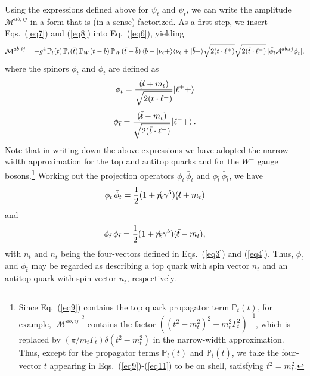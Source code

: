 \documentclass[aps,preprint,tightenlines,floatfix,superscriptaddress,nofootinbib,showpacs]{revtex4-1}
\def\beq{\begin{equation}}
\def\eeq{\end{equation}}
\def\tbslash{\tbar\hspace{-10pt}\not{}\hspace{4pt}}
\def\tslash{t\hspace{-10pt}\not{}\hspace{4pt}}
\def\nslash{n\hspace{-10pt}\not{}\hspace{4pt}}
\def\tbar{\bar{t}}
\def\bbar{\bar{b}}
\def\nubar{{\bar{\nu}}_{\ell}}
\providecommand{\DIFadd}[1]{{\protect\color{blue}\uwave{#1}}} %
\providecommand{\DIFaddbegin}{} %
\providecommand{\DIFaddend}{} %
\begin{document}
Using the expressions defined above for $\bar{\psi}_t$ and
$\psi_{\tbar}$, we can write the amplitude $\mathcal{M}^{ab,ij}$
in a form that is (in a sense) factorized.
As a first step, we insert
Eqs.~(\ref{eq7}) and (\ref{eq8}) into Eq.~(\ref{eq6}), yielding
%
\beq
\label{eq9}
\mathcal{M}^{ab,ij}=\!-g^4\,\mathbb{P}_t(t)\,\mathbb{P}_t(\tbar)\,\mathbb{P}_W(t-b)\,\mathbb{P}_W(\tbar-\bbar)\,\langle b-|\nu_{\ell}+\rangle \langle\nubar+|\bbar-\rangle \sqrt{\strut2(t\cdot {\ell}^+)}\sqrt{\strut2(\tbar\cdot {\ell}^-)}\,[\bar{\phi}_t \mathcal{A}^{ab,ij}\phi_{\tbar}],
\eeq
%
where the spinors $\phi_{t}$ and $\phi_{\tbar}$ are defined as
%
\beq
\label{eq10}
\phi_t=\frac{(\tslash +m_t)}{\sqrt{\strut2(t\cdot {\ell}^+)}}|{\ell}^++\rangle
\eeq
%
\beq
\label{eq11}
\phi_{\tbar}=\frac{(\tbslash -m_t)}{\sqrt{\strut2(\tbar\cdot {\ell}^-)}}|{\ell}^-+\rangle \,.
\eeq
%
Note that in writing down the above expressions we have adopted the narrow-width
approximation for the top and antitop quarks and for the $W^\pm$ gauge
bosons\DIFaddbegin {\bf \DIFadd{(KK: remove ``\ldots and for the\ldots''?)}}\DIFaddend .\footnote{Since Eq.~(\ref{eq9}) contains the top quark propagator
  term
  $\mathbb{P}_t(t)$, for example, $|\mathcal{M}^{ab,ij}|^2$ contains
  the factor $((t^2-m^2_t)^2+m^2_t\Gamma^2_t)^{-1}$,
  which is replaced by $(\pi/m_t\Gamma_t)\delta(t^2-m^2_t)$
  in the narrow-width approximation.  Thus, except for the propagator terms $\mathbb{P}_t(t)$ and $\mathbb{P}_t(\tbar)$,
   we take the four-vector $t$ appearing in Eqs.~(\ref{eq9})-(\ref{eq11}) to be
  on shell, satisfying $t^2 = m_t^2$.} 
Working out the projection operators $\phi_t\,\bar{\phi}_t$
and $\phi_{\tbar}\,\bar{\phi}_{\tbar}$, we have
%
\beq
\label{eq12}
\phi_t\,\bar{\phi}_t=\frac{1}{2}(1+\nslash_{\!t}\gamma^5)(\tslash +m_t)
\eeq
%
and
%
\beq
\label{eq13}
\phi_{\tbar}\,\bar{\phi}_{\tbar}=\frac{1}{2}(1+\nslash_{\!\tbar}\gamma^5)(\tbslash -m_t),
\eeq
%
with $n_t$ and $n_{\tbar}$ being the four-vectors defined in
Eqs.~(\ref{eq3}) and (\ref{eq4}).  Thus, $\phi_t$ and $\phi_{\tbar}$
may be regarded as
describing a top quark with spin vector $n_t$ and an antitop quark
with spin vector $n_{\tbar}$, respectively.
\end{document}
